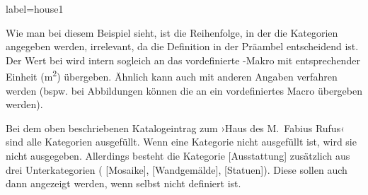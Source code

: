 \begin{lfgwprint}{label={house1}}
\end{lfgwprint}
Wie man bei diesem Beispiel sieht, ist die Reihenfolge, in der die Kategorien
 angegeben werden, irrelevant, da die Definition in der Präambel entscheidend ist.
Der Wert bei  wird intern sogleich an das vordefinierte -Makro mit entsprechender Einheit (\si{\meter\squared}) übergeben.
Ähnlich kann auch mit anderen Angaben verfahren werden (bspw. bei Abbildungen können die  an ein vordefiniertes Macro  übergeben werden).

Bei dem oben beschriebenen Katalogeintrag zum 
›Haus des M.~Fabius Rufus‹ sind alle Kategorien ausgefüllt. 
Wenn eine Kategorie nicht ausgefüllt ist, wird sie nicht ausgegeben.
Allerdings besteht die Kategorie  [Ausstattung]  zusätzlich aus drei Unterkategorien 
( [Mosaike],  [Wandgemälde],  [Statuen]).
Diese sollen auch dann angezeigt werden, wenn  selbst nicht definiert ist.

